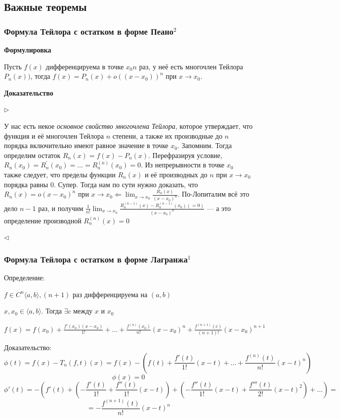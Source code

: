 \documentclass{article}
\begin{document}
\newpage
\subsection{Важные теоремы}

\subsubsection{Формула Тейлора с остатком в форме Пеано\texorpdfstring{$^2$}{}}

\textbf{Формулировка}

Пусть $f(x)$ дифференцируема в точке $x_0 n$ раз, у неё есть многочлен Тейлора $P_n(x))$, тогда $f(x) = P_n(x) + o((x - x_0))^n$ при $x \rightarrow x_0$.

\textbf{Доказательство}

$\rhd$

У нас есть некое \textit{основное свойство многочлена Тейлора}, которое утверждает, что функция и её многочлен Тейлора $n$ степени, а также их производные до $n$ порядка включительно имеют равное значение в точке $x_0$. Запомним. Тогда определим остаток $R_n(x) = f(x) - P_n(x)$. Перефразируя условие, $R_n(x_0) = R_n^\prime(x_0) = \ldots = R_n^{(n)}(x_0) = 0$. Из непрерывности в точке $x_0$ также следует, что пределы функции $R_n(x)$ и её производных до $n$ при $x \rightarrow x_0$ порядка равны 0. Супер. Тогда нам по сути нужно доказать, что $R_n(x) = o(x - x_0)^n$ при $x \rightarrow x_0 \Leftarrow \lim_{x \rightarrow x_0}\frac{R_n(x)}{(x - x_0)^n}$. По-Лопиталим всё это дело $n - 1$ раз, и получим $\frac{1}{n!}\lim_{x \rightarrow x_0}\frac{R_n^{(n - 1)}(x) - R_n^{(n - 1)}(x_0) (= 0)}{(x - x_0)^n}$ --- а это определение производной $R_n^{(n)}(x) = 0$

$\lhd$

\subsubsection{Формула Тейлора с остатком в форме Лагранжа\texorpdfstring{$^1$}{}}
Определение:

$f \in C^n\langle a, b\rangle, (n+1)$ раз дифференцируема на $(a, b)$

$x, x_0 \in \langle a, b\rangle$. Тогда $\exists c$ между $x$ и $x_0$

$f(x) = f(x_0) + \frac{f'(x_0)(x-x_0)}{1!} + \ldots + \frac{f^{(n)} (x_0)}{n!} (x-x_0)^n + \frac{f^{(n+1)} (c)}{(n+1)!}(x-x_0)^{n+1}$

Доказательство:
$$
\phi(t) = f (x) - T_n(f, t)(x) = f(x) - \left(f(t) + \frac{f'(t)}{1!}(x-t) + \ldots + \frac{f^{(n)}(t)}{n!}(x-t)^n\right)
$$
$$
\phi(x) = 0 
$$
$$
\phi'(t) = -\left(f'(t)+\left(-\frac{f'(t)}{1!}+\frac{f''(t)}{1!}(x-t)\right)+\left(-\frac{f''(t)}{1!}(x-t)+\frac{f'''(t)}{2!}(x-t)^2\right) + \ldots\right) =
$$
$$
=-\frac{f^{(n+1)}(t)}{n!}(x-t)^n
$$
\end{document}
